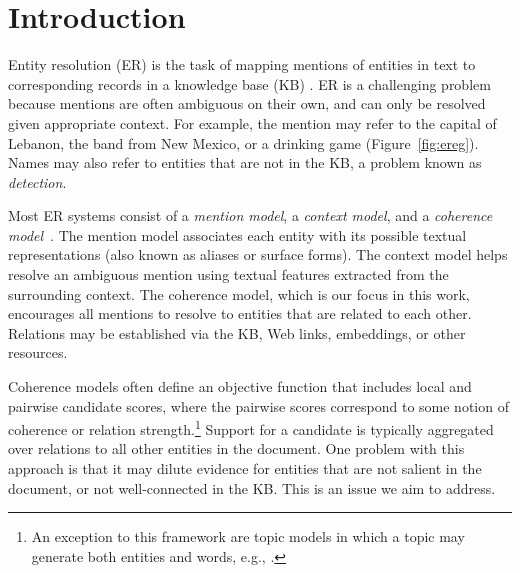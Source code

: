 \section{Introduction}
\label{sec:intro}

Entity resolution (ER) is the task of mapping mentions of entities in
text to corresponding records in a knowledge base (KB)
\cite{BunescuP06,Cucerzan07,KulkarniSRC09,Dredze2010,Hoffart2011,Hachey2013130}.
ER is a challenging problem because mentions are often ambiguous on
their own, and can only be resolved given appropriate context.  For
example, the mention  may refer to the capital of
Lebanon, the band from New Mexico, or a drinking game
(Figure~\ref{fig:ereg}).
Names may also refer to entities that are not in the KB, a problem
 known as \emph{{\NIL} detection}.

Most ER systems consist of a \emph{mention model}, a \emph{context
  model}, and a \emph{coherence
  model}~\cite{Milne2008,Cucerzan07,Ratinov11,Hoffart2011,Hachey2013130}.
The mention model associates each entity with its possible textual
representations (also known as aliases or surface forms).  The context
model helps resolve an ambiguous mention using textual features
extracted from the surrounding context. 
The coherence model, which
is our focus in this work, encourages all mentions to resolve to
entities that are related to each other.  Relations may be established
via the KB, Web links, embeddings, or other resources.

Coherence models often define an objective function that includes
local and pairwise candidate scores, where the pairwise scores
correspond to some notion of coherence or relation
strength.\footnote{An exception to this framework are topic models in
  which a topic may generate both entities and words, e.g.,
  \cite{kataria2011,HanS12,houlsby2014scalable}.} 
  Support for a candidate is typically aggregated over
relations to all other entities in the document. One problem with this approach is that it may
dilute evidence for entities that are not salient in the document, or
not well-connected in the KB. This is an issue we aim to address.

